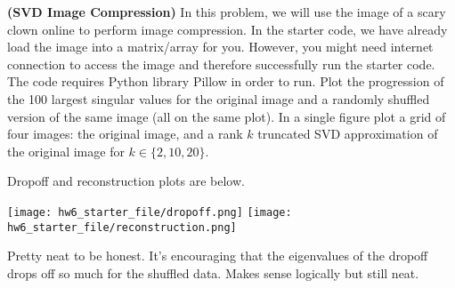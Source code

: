 \documentclass[12pt,letterpaper,fleqn]{hmcpset}
\begin{document}
\begin{problem}[2]
\textbf{(SVD Image Compression)}
In this problem, we will use the image of a scary clown online to perform image compression.  In the starter code, we have already load the image into a matrix/array for you. However, you might need internet connection to access the image and therefore successfully run the starter code. The code requires Python library Pillow in order to run.
\newline
\newline 
Plot the progression of the 100 largest singular values for the original image
and a randomly shuffled version of the same image (all on the same plot). In a single figure plot
a grid of four images: the original image, and a rank $k$ truncated SVD approximation of the original
image for $k\in\{2,10,20\}$.

\end{problem}
\begin{solution}
Dropoff and reconstruction plots are below.
\begin{center}
    \texttt{[image: hw6\_starter\_file/dropoff.png]}
    \texttt{[image: hw6\_starter\_file/reconstruction.png]}
\end{center}
Pretty neat to be honest. It's encouraging that the eigenvalues of the dropoff drops off so much for the shuffled data. Makes sense logically but still neat. 
\end{solution}
\end{document}
